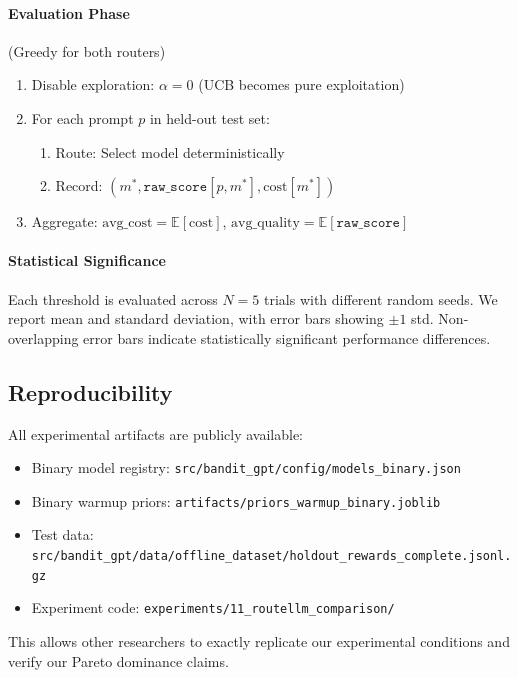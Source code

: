 \paragraph{Evaluation Phase} (Greedy for both routers)
\begin{enumerate}
    \item Disable exploration: $\alpha = 0$ (UCB becomes pure exploitation)
    \item For each prompt $p$ in held-out test set:
        \begin{enumerate}
            \item Route: Select model deterministically
            \item Record: $(m^*, \texttt{raw\_score}[p, m^*], \text{cost}[m^*])$
        \end{enumerate}
    \item Aggregate: $\text{avg\_cost} = \mathbb{E}[\text{cost}]$, $\text{avg\_quality} = \mathbb{E}[\texttt{raw\_score}]$
\end{enumerate}

\paragraph{Statistical Significance}
Each threshold is evaluated across $N=5$ trials with different random seeds. We report mean and standard deviation, with error bars showing $\pm 1$ std. Non-overlapping error bars indicate statistically significant performance differences.

\subsection{Reproducibility}

All experimental artifacts are publicly available:
\begin{itemize}
    \item Binary model registry: \texttt{src/bandit\_gpt/config/models\_binary.json}
    \item Binary warmup priors: \texttt{artifacts/priors\_warmup\_binary.joblib}
    \item Test data: \texttt{src/bandit\_gpt/data/offline\_dataset/holdout\_rewards\_complete.jsonl.gz}
    \item Experiment code: \texttt{experiments/11\_routellm\_comparison/}
\end{itemize}

\noindent This allows other researchers to exactly replicate our experimental conditions and verify our Pareto dominance claims.

